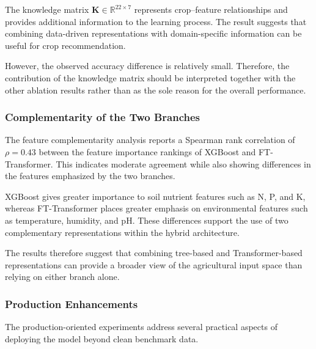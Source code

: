 \documentclass[journal]{IEEEtran}
\begin{document}
The knowledge matrix $\mathbf{K} \in \mathbb{R}^{22 \times 7}$ represents crop--feature relationships and provides additional information to the learning process. The result suggests that combining data-driven representations with domain-specific information can be useful for crop recommendation.

However, the observed accuracy difference is relatively small. Therefore, the contribution of the knowledge matrix should be interpreted together with the other ablation results rather than as the sole reason for the overall performance.


\subsubsection{Complementarity of the Two Branches}

The feature complementarity analysis reports a Spearman rank correlation of $\rho=0.43$ between the feature importance rankings of XGBoost and FT-Transformer. This indicates moderate agreement while also showing differences in the features emphasized by the two branches.

XGBoost gives greater importance to soil nutrient features such as N, P, and K, whereas FT-Transformer places greater emphasis on environmental features such as temperature, humidity, and pH. These differences support the use of two complementary representations within the hybrid architecture.

The results therefore suggest that combining tree-based and Transformer-based representations can provide a broader view of the agricultural input space than relying on either branch alone.


\subsubsection{Production Enhancements}

The production-oriented experiments address several practical aspects of deploying the model beyond clean benchmark data.
\end{document}

